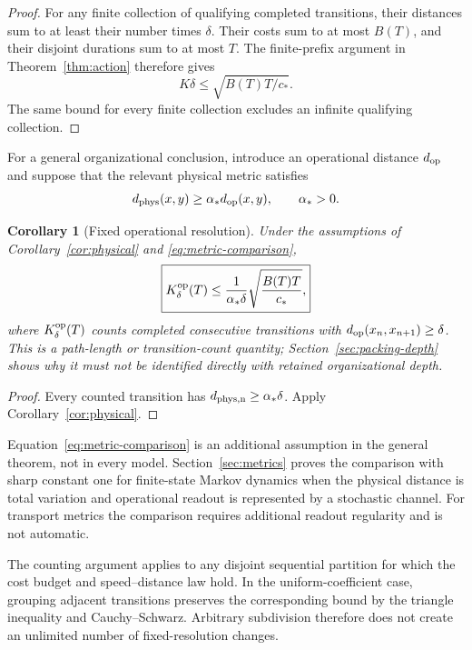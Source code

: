 \documentclass[11pt,a4paper]{article}
\newtheorem{corollary}[theorem]{Corollary}
\theoremstyle{definition}
\numberwithin{equation}{section}
\begin{document}
\begin{proof}
For any finite collection of qualifying completed transitions,
their distances sum to at least their number times $\delta$.
Their costs sum to at most $B(T)$, and their disjoint durations
sum to at most $T$. The finite-prefix argument in
Theorem~\ref{thm:action} therefore gives
\[
K\delta\le\sqrt{B(T)T/c_*}.
\]
The same bound for every finite collection excludes an infinite
qualifying collection.
\end{proof}

For a general organizational conclusion, introduce an operational distance
$d_{\rm op}$ and suppose that the relevant physical metric satisfies
\begin{equation}
d_{\rm phys}(x,y)\ge\alpha_*d_{\rm op}(x,y),
\qquad \alpha_*>0.
\label{eq:metric-comparison}
\end{equation}

\begin{corollary}[Fixed operational resolution]
\label{cor:operational}
Under the assumptions of Corollary~\ref{cor:physical} and
\eqref{eq:metric-comparison},
\begin{equation}
\boxed{
K_{\delta}^{\rm op}(T)
\le
\frac1{\alpha_*\delta}
\sqrt{\frac{B(T)T}{c_*}},
}
\label{eq:operational-count}
\end{equation}
where $K_{\delta}^{\rm op}(T)$ counts completed \emph{consecutive}
transitions with $d_{\rm op}(x_n,x_{n+1})\ge\delta$. This is a path-length
or transition-count quantity; Section~\ref{sec:packing-depth} shows why it
must not be identified directly with retained organizational depth.
\end{corollary}

\begin{proof}
Every counted transition has
$d_{\rm phys,n}\ge\alpha_*\delta$.
Apply Corollary~\ref{cor:physical}.
\end{proof}

Equation~\eqref{eq:metric-comparison} is an additional assumption in the
general theorem, not in every model. Section~\ref{sec:metrics} proves the
comparison with sharp constant one for finite-state Markov dynamics when the
physical distance is total variation and operational readout is represented by
a stochastic channel. For transport metrics the comparison requires additional
readout regularity and is not automatic.

The counting argument applies to any disjoint sequential partition
for which the cost budget and speed--distance law hold. In the
uniform-coefficient case, grouping adjacent transitions preserves
the corresponding bound by the triangle inequality and
Cauchy--Schwarz. Arbitrary subdivision therefore does not create
an unlimited number of fixed-resolution changes.
\end{document}
